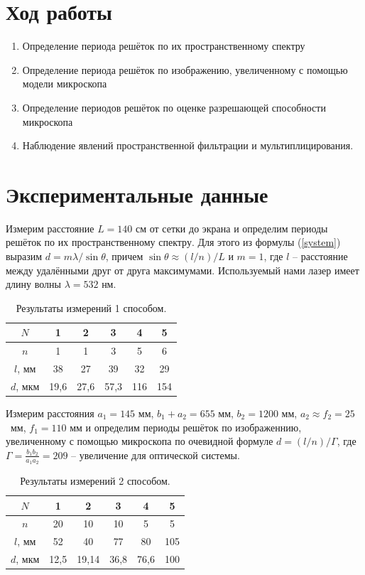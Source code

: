 \documentclass[a4paper,12pt]{article} %
\begin{document}
\section{Ход работы}
	\begin{enumerate}
		\item
			Определение периода решёток по их пространственному спектру
		\item 
			Определение периода решёток по изображению, увеличенному с помощью модели микроскопа
		\item
			Определение периодов решёток по оценке разрешающей способности микроскопа
		\item 
			Наблюдение явлений пространственной фильтрации и мультиплицирования.
	\end{enumerate}
\newpage
\section{Экспериментальные данные}

	Измерим расстояние $L = 140$ см от сетки до экрана и определим периоды решёток по их пространственному спектру. Для этого из формулы (\ref{system}) выразим $d = m \lambda / \sin \theta$, причем $\sin \theta \approx (l/n)/L$ и $m = 1$, где $l$ -- расстояние между удалёнными друг от друга максимумами. Используемый нами лазер имеет длину волны $\lambda = 532$ нм.
	
	\begin{table}[H]
		\caption{Результаты измерений 1 способом.}
		\label{table:exp1}
		\begin{tabular}{|c|c|c|c|c|c|}
			\hline
			$N$      & 1     & 2     & 3     & 4      & 5      \\ \hline
			$n$      & 1     & 1     & 3     & 5      & 6      \\ \hline
			$l$, мм  & 38    & 27    & 39    & 32     & 29     \\ \hline
			$d$, мкм & 19,6 & 27,6 & 57,3 & 116 & 154 \\ \hline
		\end{tabular}
	\end{table}
	
	Измерим расстояния $a_1 = 145$ мм, $b_1+a_2 = 655$ мм, $b_2 = 1200$ мм, $a_2 \approx f_2 = 25$~мм, $f_1 = 110$ мм и определим периоды решёток по изображеннию, увеличенному с помощью микроскопа по очевидной формуле $d = (l/n)/\Gamma$, где $\Gamma = \frac{b_1b_2}{a_1a_2} = 209$ -- увеличение для оптической системы.
	\begin{table}[H]
		\caption{Результаты измерений 2 способом.}
		\label{table:exp2}
		\begin{tabular}{|c|c|c|c|c|c|}
			\hline
			$N$      & 1    & 2     & 3    & 4    & 5   \\ \hline
			$n$      & 20   & 10    & 10   & 5    & 5   \\ \hline
			$l$, мм  & 52   & 40    & 77   & 80   & 105 \\ \hline
			$d$, мкм & 12,5 & 19,14 & 36,8 & 76,6 & 100 \\ \hline
		\end{tabular}
	\end{table}
\end{document}
